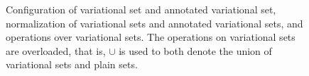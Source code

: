 \begin{figure}
%
%
%


\caption[(Annotated) Variational set configuration and operations]{Configuration of variational set and annotated variational set, normalization of variational sets and annotated variational sets, and operations over variational sets. The operations on variational sets
are overloaded, that is, $\cup$ is used to both denote the union of variational sets and plain sets.
}
\label{fig:vset}
\end{figure}

